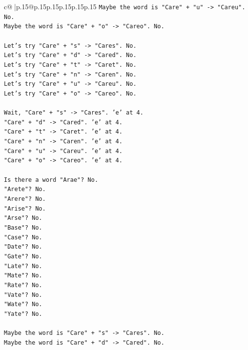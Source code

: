 \documentclass{article}
\begin{document}
{\begin{supertabular}{c@{$\;$}|p{.15\linewidth}@{}p{.15\linewidth}p{.15\linewidth}p{.15\linewidth}p{.15\linewidth}p{.15\linewidth}}
{{{\texttt{Maybe the word is "Care" + "u" {-}> "Careu". No.} \\
\texttt{Maybe the word is "Care" + "o" {-}> "Careo". No.} \\
\\ 
\texttt{Let's try "Care" + "s" {-}> "Cares". No.} \\
\texttt{Let's try "Care" + "d" {-}> "Cared". No.} \\
\texttt{Let's try "Care" + "t" {-}> "Caret". No.} \\
\texttt{Let's try "Care" + "n" {-}> "Caren". No.} \\
\texttt{Let's try "Care" + "u" {-}> "Careu". No.} \\
\texttt{Let's try "Care" + "o" {-}> "Careo". No.} \\
\\ 
\texttt{Wait, "Care" + "s" {-}> "Cares". 'e' at 4.} \\
\texttt{"Care" + "d" {-}> "Cared". 'e' at 4.} \\
\texttt{"Care" + "t" {-}> "Caret". 'e' at 4.} \\
\texttt{"Care" + "n" {-}> "Caren". 'e' at 4.} \\
\texttt{"Care" + "u" {-}> "Careu". 'e' at 4.} \\
\texttt{"Care" + "o" {-}> "Careo". 'e' at 4.} \\
\\ 
\texttt{Is there a word "Arae"? No.} \\
\texttt{"Arete"? No.} \\
\texttt{"Arere"? No.} \\
\texttt{"Arise"? No.} \\
\texttt{"Arse"? No.} \\
\texttt{"Base"? No.} \\
\texttt{"Case"? No.} \\
\texttt{"Date"? No.} \\
\texttt{"Gate"? No.} \\
\texttt{"Late"? No.} \\
\texttt{"Mate"? No.} \\
\texttt{"Rate"? No.} \\
\texttt{"Vate"? No.} \\
\texttt{"Wate"? No.} \\
\texttt{"Yate"? No.} \\
\\ 
\texttt{Maybe the word is "Care" + "s" {-}> "Cares". No.} \\
\texttt{Maybe the word is "Care" + "d" {-}> "Cared". No.} \\
}}}
\end{supertabular}}
\end{document}
